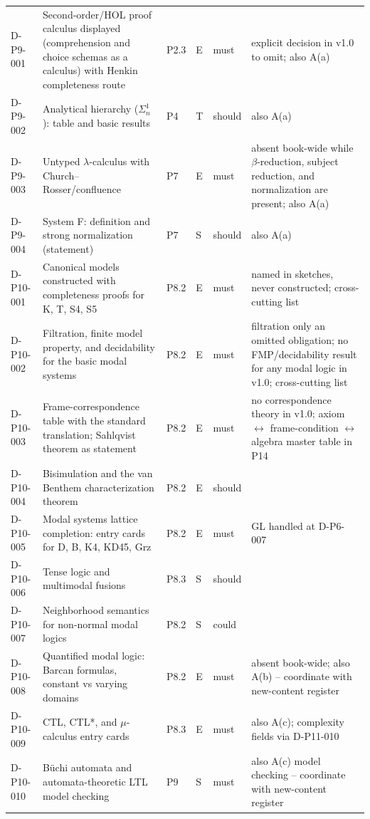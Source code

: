 \begin{longtable}{@{}p{0.62in}p{2.6in}p{0.75in}p{0.22in}p{0.42in}p{1.85in}@{}}
D-P9-001 & Second-order/HOL proof calculus displayed (comprehension and choice schemas as a calculus) with Henkin completeness route & P2.3 & E & must & explicit decision in v1.0 to omit; also A(a) \\
D-P9-002 & Analytical hierarchy (\(\Sigma^1_n\)): table and basic results & P4 & T & should & also A(a) \\
D-P9-003 & Untyped \(\lambda\)-calculus with Church--Rosser/confluence & P7 & E & must & absent book-wide while \(\beta\)-reduction, subject reduction, and normalization are present; also A(a) \\
D-P9-004 & System F: definition and strong normalization (statement) & P7 & S & should & also A(a) \\
D-P10-001 & Canonical models constructed with completeness proofs for K, T, S4, S5 & P8.2 & E & must & named in sketches, never constructed; cross-cutting list \\
D-P10-002 & Filtration, finite model property, and decidability for the basic modal systems & P8.2 & E & must & filtration only an omitted obligation; no FMP/decidability result for any modal logic in v1.0; cross-cutting list \\
D-P10-003 & Frame-correspondence table with the standard translation; Sahlqvist theorem as statement & P8.2 & E & must & no correspondence theory in v1.0; axiom \(\leftrightarrow\) frame-condition \(\leftrightarrow\) algebra master table in P14 \\
D-P10-004 & Bisimulation and the van Benthem characterization theorem & P8.2 & E & should &  \\
D-P10-005 & Modal systems lattice completion: entry cards for D, B, K4, KD45, Grz & P8.2 & E & must & GL handled at D-P6-007 \\
D-P10-006 & Tense logic and multimodal fusions & P8.3 & S & should &  \\
D-P10-007 & Neighborhood semantics for non-normal modal logics & P8.2 & S & could &  \\
D-P10-008 & Quantified modal logic: Barcan formulas, constant vs varying domains & P8.2 & E & must & absent book-wide; also A(b) -- coordinate with new-content register \\
D-P10-009 & CTL, CTL*, and \(\mu\)-calculus entry cards & P8.3 & E & must & also A(c); complexity fields via D-P11-010 \\
D-P10-010 & B\"uchi automata and automata-theoretic LTL model checking & P9 & S & must & also A(c) model checking -- coordinate with new-content register \\

\end{longtable}
